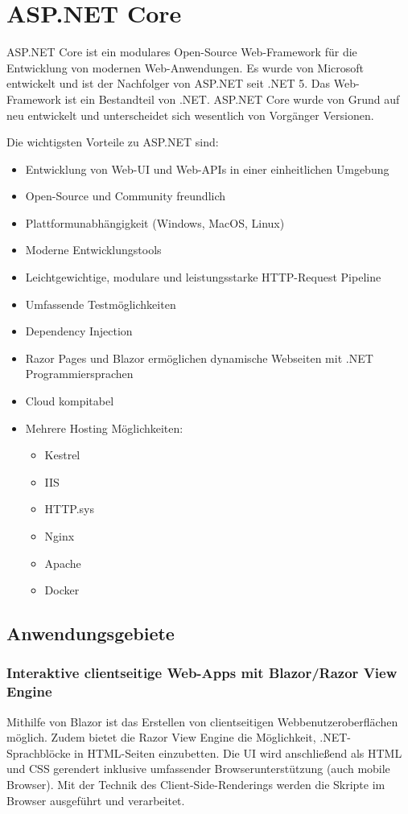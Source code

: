 \section{ASP.NET Core}
ASP.NET Core ist ein modulares Open-Source Web-Framework für die Entwicklung von modernen Web-Anwendungen.
Es wurde von Microsoft entwickelt und ist der Nachfolger von ASP.NET seit .NET 5. Das Web-Framework ist ein Bestandteil von 
.NET. ASP.NET Core wurde von Grund auf neu entwickelt und unterscheidet sich wesentlich von Vorgänger Versionen. 

Die wichtigsten Vorteile zu ASP.NET sind:
\begin{itemize}
    \item Entwicklung von Web-UI und Web-APIs in einer einheitlichen Umgebung
    \item Open-Source und Community freundlich
    \item Plattformunabhängigkeit (Windows, MacOS, Linux)
    \item Moderne Entwicklungstools
    \item Leichtgewichtige, modulare und leistungsstarke HTTP-Request Pipeline
    \item Umfassende Testmöglichkeiten
    \item Dependency Injection
    \item Razor Pages und Blazor ermöglichen dynamische Webseiten mit .NET Programmiersprachen
    \item Cloud kompitabel
    \item Mehrere Hosting Möglichkeiten:
    \begin{itemize}
        \item Kestrel
        \item IIS
        \item HTTP.sys
        \item Nginx
        \item Apache
        \item Docker
    \end{itemize}
\end{itemize}

\subsection{Anwendungsgebiete}

\subsubsection{Interaktive clientseitige Web-Apps mit Blazor/Razor View Engine}
Mithilfe von Blazor ist das Erstellen von clientseitigen Webbenutzeroberflächen möglich.
Zudem bietet die Razor View Engine die Möglichkeit, .NET-Sprachblöcke in HTML-Seiten einzubetten.
Die UI wird anschließend als HTML und CSS gerendert inklusive umfassender Browserunterstützung (auch mobile Browser).
Mit der Technik des Client-Side-Renderings werden die Skripte im Browser ausgeführt und verarbeitet.

